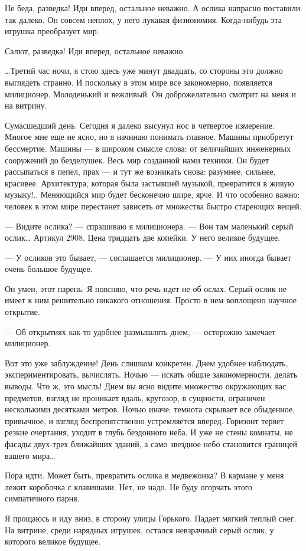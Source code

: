 Не беда,  разведка!  Иди  вперед, остальное  неважно.  А  ослика  напрасно
поставили так  далеко.  Он  совсем  неплох,  у  него  лукавая  физиономия.
Когда-нибудь эта игрушка преобразует мир.

Салют, разведка! Иди вперед, остальное неважно.

…Третий час ночи, я стою здесь  уже минут двадцать, со стороны это  должно
выглядеть странно. И  поскольку в  этом мире  все закономерно,  появляется
милиционер. Молоденький и вежливый. Он  доброжелательно смотрит на меня  и
на витрину.

Сумасшедший день.  Сегодня я  далеко высунул  нос в  четвертое  измерение.
Многое мне еще не ясно, но  я начинаю понимать главное. Машины  приобретут
бессмертие. Машины  — в  широком смысле  слова: от  величайших  инженерных
сооружений до  безделушек.  Весь  мир созданной  нами  техники.  Он  будет
рассыпаться в пепел, прах — и  тут же возникать снова: разумнее,  сильнее,
красивее. Архитектура, которая была застывшей музыкой, превратится в живую
музыку!.. Меняющийся  мир  будет бесконечно  шире,  ярче. И  что  особенно
важно: человек  в  этом  мире  перестанет  зависеть  от  множества  быстро
стареющих вещей.

— Видите ослика?  — спрашиваю  я милиционера.  — Вон  там маленький  серый
ослик… Артикул 2908. Цена тридцать две копейки. У него великое будущее.

— У осликов это  бывает, — соглашается милиционер.  — У них иногда  бывает
очень большое будущее.

Он умен, этот парень. Я поясняю, что речь идет не об ослах. Серый ослик не
имеет к ним решительно никакого отношения. Просто в нем воплощено  научное
открытие.

— Об  открытиях  как-то  удобнее размышлять  днем,  —  осторожно  замечает
милиционер.

Вот это уже заблуждение! День  слишком конкретен. Днем удобнее  наблюдать,
экспериментировать, вычислять. Ночью — искать общие закономерности, делать
выводы. Что ж,  это мысль! Днем  вы ясно видите  множество окружающих  вас
предметов, взгляд  не проникает  вдаль,  кругозор, в  сущности,  ограничен
несколькими десятками метров. Ночью иначе: темнота скрывает все обыденное,
привычное, и взгляд беспрепятственно устремляется вперед. Горизонт  теряет
резкие очертания, уходит в глубь бездонного неба. И уже не стены  комнаты,
не фасады  двух-трех ближайших  зданий, а  само звездное  небо  становится
границей вашего мира…

Пора идти. Может быть,  превратить ослика в медвежонка?  В кармане у  меня
лежит коробочка  с  клавишами.  Нет,  не  надо.  Не  буду  огорчать  этого
симпатичного парня.

Я прощаюсь и иду вниз, в  сторону улицы Горького. Падает мягкий теплый
снег.  На витрине,  среди нарядных  игрушек, остался  невзрачный серый
ослик, у которого великое будущее.
